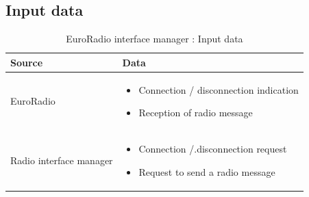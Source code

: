 \documentclass[nocc]{template/openetcs_report}
\begin{document}
\subsection{Input data}
			\begin{longtable}{|l|l|}
				\caption{EuroRadio interface manager : Input data}\\ 
				\hline
				
					\begin{minipage}[t]{0.35\linewidth} \textbf{Source}	\end{minipage} 
				&	\begin{minipage}[t]{0.65\linewidth} \textbf{Data} \end{minipage} \\
				
				\hline
																																									
					\begin{minipage}[t]{0.35\linewidth} EuroRadio	\end{minipage} 
				&	\begin{minipage}[t]{0.65\linewidth}
						\begin{itemize}
							\item Connection / disconnection indication
							\item Reception of radio message
						\end{itemize}
					\end{minipage} \\
				
				\hline
				
					\begin{minipage}[t]{0.35\linewidth} Radio interface manager	\end{minipage} 
				&	\begin{minipage}[t]{0.65\linewidth}
						\begin{itemize}
							\item Connection /.disconnection request
							\item Request to send a radio message
						\end{itemize}			
					\end{minipage} \\
				
				\hline	
			\end{longtable}	
\end{document}
